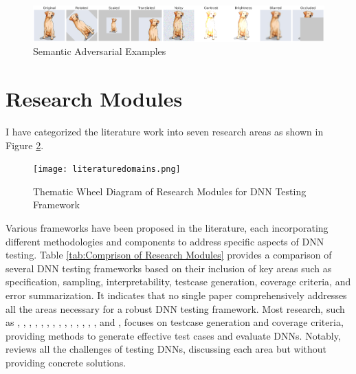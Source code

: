   \begin{figure}
    \centering
    \includegraphics[width=\linewidth]{figures/output_update.png}
    \caption{Semantic Adversarial Examples}
    \label{fig:image-trans}
  \end{figure}


\section{Research Modules}

I have categorized the literature work into seven research areas as shown in Figure \ref{fig:thematic_wheel}. 
\begin{figure}[h]
  \centering
  \texttt{[image: literaturedomains.png]}
  \caption{Thematic Wheel Diagram of Research Modules for DNN Testing Framework}
  \label{fig:thematic_wheel}
\end{figure}



 Various frameworks have been proposed in the literature, each incorporating different methodologies and components to address specific aspects of DNN testing. Table \ref{tab:Comprison of Research Modules} provides a comparison of several DNN testing frameworks based on their inclusion of key areas such as specification, sampling, interpretability, testcase generation, coverage criteria, and error summarization. It indicates that no single paper comprehensively addresses all the areas necessary for a robust DNN testing framework. Most research, such as \cite{deepxplore}, \cite{deeptest}, \cite{Wicker}, \cite{Ma}, \cite{SunY}, \cite{Sun}, \cite{Cheng}, \cite{Kim}, \cite{Concolic}, \cite{Deepconcolic}, \cite{tensorfuzz}, \cite{Deephunter}, \cite{DLFuzz}, \cite{Sayah}, and \cite{Dola}, focuses on testcase generation and coverage criteria, providing methods to generate effective test cases and evaluate DNNs. Notably, \cite{Braiek} reviews all the challenges of testing DNNs, discussing each area but without providing concrete solutions.

